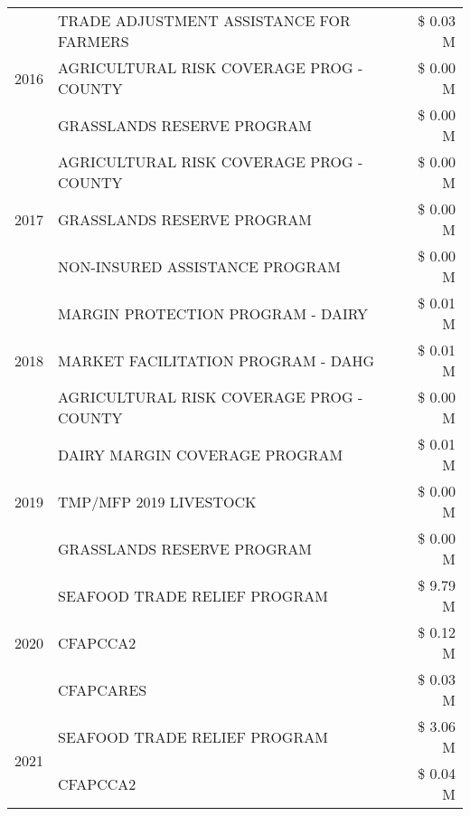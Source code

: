 \begin{tabular}{llr}
\cline{1-3}
\multirow[t]{3}{*}{2016} & TRADE ADJUSTMENT ASSISTANCE FOR FARMERS & \$ 0.03 M \\
 & AGRICULTURAL RISK COVERAGE PROG - COUNTY & \$ 0.00 M \\
 & GRASSLANDS RESERVE PROGRAM & \$ 0.00 M \\
\cline{1-3}
\multirow[t]{3}{*}{2017} & AGRICULTURAL RISK COVERAGE PROG - COUNTY & \$ 0.00 M \\
 & GRASSLANDS RESERVE PROGRAM & \$ 0.00 M \\
 & NON-INSURED ASSISTANCE PROGRAM & \$ 0.00 M \\
\cline{1-3}
\multirow[t]{3}{*}{2018} & MARGIN PROTECTION PROGRAM - DAIRY & \$ 0.01 M \\
 & MARKET FACILITATION PROGRAM - DAHG & \$ 0.01 M \\
 & AGRICULTURAL RISK COVERAGE PROG - COUNTY & \$ 0.00 M \\
\cline{1-3}
\multirow[t]{3}{*}{2019} & DAIRY MARGIN COVERAGE PROGRAM & \$ 0.01 M \\
 & TMP/MFP 2019 LIVESTOCK & \$ 0.00 M \\
 & GRASSLANDS RESERVE PROGRAM & \$ 0.00 M \\
\cline{1-3}
\multirow[t]{3}{*}{2020} & SEAFOOD TRADE RELIEF PROGRAM & \$ 9.79 M \\
 & CFAPCCA2 & \$ 0.12 M \\
 & CFAPCARES & \$ 0.03 M \\
\cline{1-3}
\multirow[t]{2}{*}{2021} & SEAFOOD TRADE RELIEF PROGRAM & \$ 3.06 M \\
 & CFAPCCA2 & \$ 0.04 M \\
\cline{1-3}
\bottomrule
\end{tabular}
